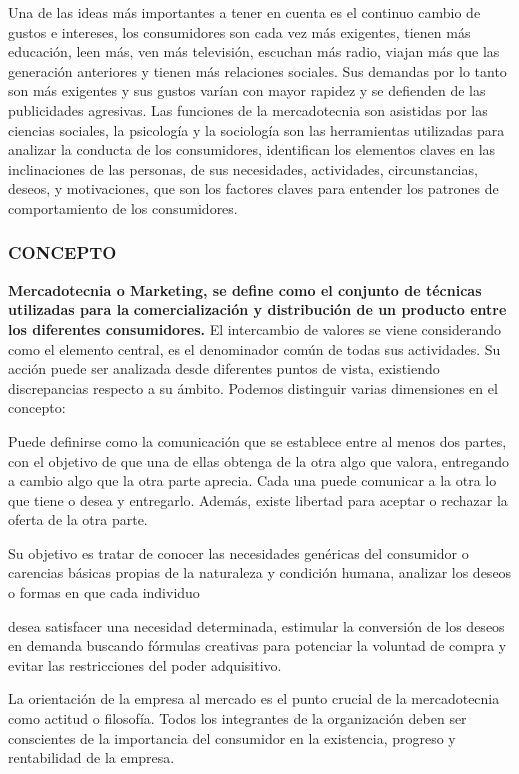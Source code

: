 Una de las ideas más importantes a tener en cuenta es el continuo cambio de gustos e intereses, los consumidores son cada vez más exigentes, tienen más educación, leen más, ven más televisión, escuchan más radio, viajan más que las generación anteriores y tienen más relaciones sociales. Sus demandas por lo tanto son más exigentes y sus gustos varían con mayor rapidez y se defienden de las publicidades agresivas. Las funciones de la mercadotecnia son asistidas por las ciencias sociales, la psicología y la sociología son las herramientas utilizadas para analizar la conducta de los consumidores, identifican los elementos claves en las inclinaciones de las personas, de sus necesidades, actividades, circunstancias, deseos, y motivaciones, que son los factores claves para entender los patrones de comportamiento de los consumidores.

\subsubsection*{CONCEPTO}
\textbf{Mercadotecnia o Marketing, se define como el conjunto de técnicas utilizadas para la} \textbf{comercialización y distribución de un producto entre los diferentes consumidores.} El intercambio de valores se viene considerando como el elemento central, es el denominador común de todas sus actividades. Su acción puede ser analizada desde diferentes puntos de vista, existiendo discrepancias respecto a su ámbito. Podemos distinguir varias dimensiones en el concepto:

Puede definirse como la comunicación que se establece entre al menos dos partes, con el objetivo de que una de ellas obtenga de la otra algo que valora, entregando a cambio algo que la otra parte aprecia. Cada una puede comunicar a la otra lo que tiene o desea y entregarlo. Además, existe libertad para aceptar o rechazar la oferta de la otra parte.

Su objetivo es tratar de conocer las necesidades genéricas del consumidor o carencias básicas propias de la naturaleza y condición humana, analizar los deseos o formas en que cada individuo



desea satisfacer una necesidad determinada, estimular la conversión de los deseos en demanda buscando fórmulas creativas para potenciar la voluntad de compra y evitar las restricciones del poder adquisitivo.

La orientación de la empresa al mercado es el punto crucial de la mercadotecnia como actitud o filosofía. Todos los integrantes de la organización deben ser conscientes de la importancia del consumidor en la existencia, progreso y rentabilidad de la empresa.

